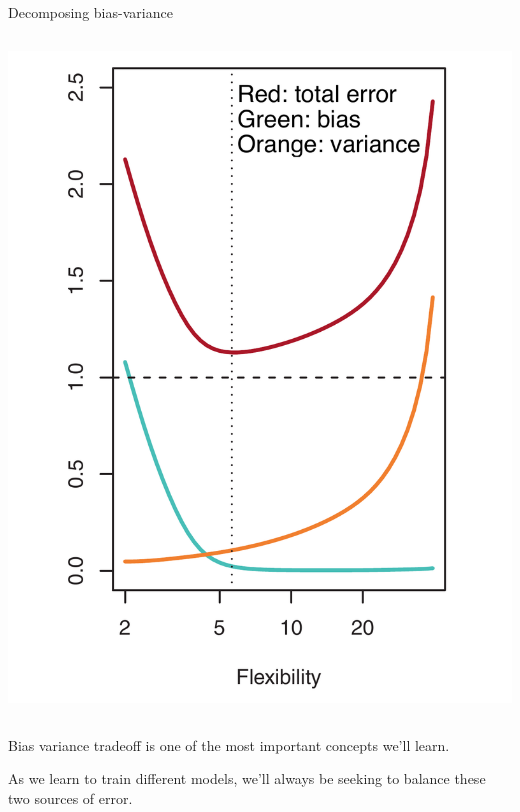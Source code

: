 \documentclass[aspectratio=169]{beamer}
\begin{document}
\begin{frame}{Decomposing bias-variance}
\begin{columns}
\pause 
\includegraphics[scale=0.21]{figures/islr2_12a_text.pdf}

\end{columns}

\end{frame}


\begin{frame}{Bias variance tradeoff is one of the most important concepts we'll learn.}
    
As we learn to train different models, we'll always be seeking to balance these two sources of error.

\end{frame}
\end{document}
